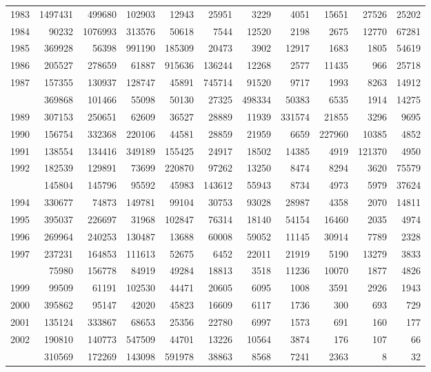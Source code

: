 \documentclass[
]{article}
\begin{document}
\begin{longtable}[t]{lrrrrrrrrrr}
1983 & 1497431 & 499680 & 102903 & 12943 & 25951 & 3229 & 4051 & 15651 & 27526 & 25202\\
1984 & 90232 & 1076993 & 313576 & 50618 & 7544 & 12520 & 2198 & 2675 & 12770 & 67281\\
1985 & 369928 & 56398 & 991190 & 185309 & 20473 & 3902 & 12917 & 1683 & 1805 & 54619\\
1986 & 205527 & 278659 & 61887 & 915636 & 136244 & 12268 & 2577 & 11435 & 966 & 25718\\
1987 & 157355 & 130937 & 128747 & 45891 & 745714 & 91520 & 9717 & 1993 & 8263 & 14912\\
\addlinespace
1988 & 369868 & 101466 & 55098 & 50130 & 27325 & 498334 & 50383 & 6535 & 1914 & 14275\\
1989 & 307153 & 250651 & 62609 & 36527 & 28889 & 11939 & 331574 & 21855 & 3296 & 9695\\
1990 & 156754 & 332368 & 220106 & 44581 & 28859 & 21959 & 6659 & 227960 & 10385 & 4852\\
1991 & 138554 & 134416 & 349189 & 155425 & 24917 & 18502 & 14385 & 4919 & 121370 & 4950\\
1992 & 182539 & 129891 & 73699 & 220870 & 97262 & 13250 & 8474 & 8294 & 3620 & 75579\\
\addlinespace
1993 & 145804 & 145796 & 95592 & 45983 & 143612 & 55943 & 8734 & 4973 & 5979 & 37624\\
1994 & 330677 & 74873 & 149781 & 99104 & 30753 & 93028 & 28987 & 4358 & 2070 & 14811\\
1995 & 395037 & 226697 & 31968 & 102847 & 76314 & 18140 & 54154 & 16460 & 2035 & 4974\\
1996 & 269964 & 240253 & 130487 & 13688 & 60008 & 59052 & 11145 & 30914 & 7789 & 2328\\
1997 & 237231 & 164853 & 111613 & 52675 & 6452 & 22011 & 21919 & 5190 & 13279 & 3833\\
\addlinespace
1998 & 75980 & 156778 & 84919 & 49284 & 18813 & 3518 & 11236 & 10070 & 1877 & 4826\\
1999 & 99509 & 61191 & 102530 & 44471 & 20605 & 6095 & 1008 & 3591 & 2926 & 1943\\
2000 & 395862 & 95147 & 42020 & 45823 & 16609 & 6117 & 1736 & 300 & 693 & 729\\
2001 & 135124 & 333867 & 68653 & 25356 & 22780 & 6997 & 1573 & 691 & 160 & 177\\
2002 & 190810 & 140773 & 547509 & 44701 & 13226 & 10564 & 3874 & 176 & 107 & 66\\
\addlinespace
2003 & 310569 & 172269 & 143098 & 591978 & 38863 & 8568 & 7241 & 2363 & 8 & 32\\

\end{longtable}
\end{document}
